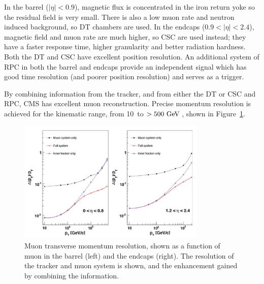 In the barrel ($|\eta|<0.9$), magnetic flux is concentrated in the iron return yoke so the residual field is very small.
There is also a low muon rate and neutron induced background, so \ac{DT} chambers are used.
In the endcaps ($0.9<|\eta|<2.4$), magnetic field and muon rate are much higher, so \ac{CSC} are used instead; 
they have a faster response time, higher granularity and better radiation hardness.
Both the \ac{DT} and \ac{CSC} have excellent position resolution.
An additional system of \ac{RPC} in both the barrel and endcaps provide an independent signal which has good time resolution (and poorer position resolution) and serves as a trigger.


By combining information from the tracker, and from either the \ac{DT} or \ac{CSC} and \ac{RPC}, \ac{CMS} has excellent muon reconstruction. 
Precise momentum resolution is achieved for the kinematic range, from 10~\GeV to $>500~\mathrm{GeV}\,$, shown in  
Figure~\ref{fig:CMSmuonRes}. 

\begin{figure}[htbp]
  \begin{center}
  \includegraphics[width=0.8\textwidth]{Figures/detector/CMSmuonRes}
  \caption{Muon transverse momentum resolution, shown as a function of muon \pt in the barrel (left) and the endcaps (right). The resolution of the tracker and muon system is shown, and the enhancement gained by combining the information.
}
  \label{fig:CMSmuonRes}
  \end{center}
\end{figure}

%                                                                  

